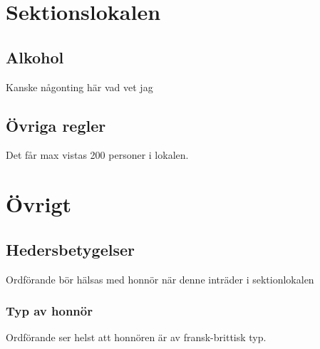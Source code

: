 \documentclass{../resources/dgovdoc}
\begin{document}
\section{Sektionslokalen}

\subsection{Alkohol}
Kanske någonting här vad vet jag

\subsection{Övriga regler}

Det får max vistas 200 personer i lokalen. 

\section{Övrigt}

\subsection{Hedersbetygelser}

Ordförande bör hälsas med honnör när denne inträder i sektionlokalen

\subsubsection{Typ av honnör}

Ordförande ser helst att honnören är av fransk-brittisk typ.
\end{document}
